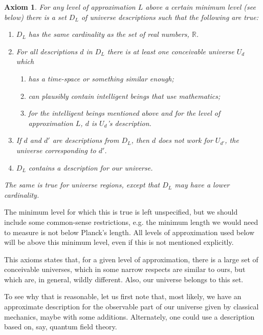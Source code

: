 \documentclass[a4paper
,draft
]{article}
\def\reale{\mathbb{R}}
\def\descriptions{D_L}
\newtheorem{axiom}{Axiom}
\begin{document}
\begin{axiom}\label{uncountable}
  For any level of approximation $L$ above a certain minimum level (see below)
  there is a set $\descriptions$
  of universe descriptions such that the following are true:
  \begin{enumerate}
    \item $\descriptions$ has the same cardinality as
          the set of real numbers, $\reale$.
    \item For all descriptions $d$ in $\descriptions$
          there is at least one conceivable
          universe $U_d$ which
      \begin{enumerate}
        \item has a time-space or something similar enough;
        \item can plausibly contain intelligent beings that use mathematics;
        \item for the intelligent beings mentioned above and
              for the level of approximation $L$,
              $d$ is $U_d$'s description.
      \end{enumerate}
    \item If $d$ and $d'$ are descriptions from $\descriptions$,
          then $d$ does not work
          for $U_{d'}$, the universe corresponding to $d'$.
    \item $\descriptions$ contains a description for our universe.
  \end{enumerate}
  The same is true for universe regions, except that
  $\descriptions$ may have a lower
  cardinality.
\end{axiom}

The minimum level for which this is true is left unspecified, but we should
include some common-sense restrictions, e.g. the minimum length we would
need to measure is not below Planck's length.
All levels of approximation used below will be above this
minimum level, even if this is not mentioned explicitly.

This axioms states that, for a given level of approximation,
there is a large set of conceivable universes, which in some narrow respects
are similar to ours, but which are, in general, wildly different.
Also, our universe belongs to this set.

To see why that is reasonable, let us first note that,
most likely, we have an approximate description for the observable part
of our universe
given by classical mechanics, maybe with some additions.
Alternately, one could use a description based on, say, quantum field theory.
\end{document}

